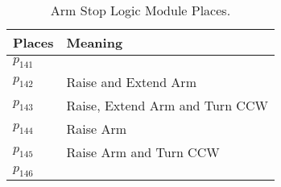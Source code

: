 \begin{table}[H]
\caption{Arm Stop Logic Module Places.}
\centering
\begin{tabular}{M{5cm}M{10cm}}
Places & Meaning\\
\hline
\hyperlink{partialNet:p141}{\hypertarget{partialTable:p141}{$p_{141}$}} & \\
\hyperlink{partialNet:p142}{\hypertarget{partialTable:p142}{$p_{142}$}} & Raise and Extend Arm\\
\hyperlink{partialNet:p143}{\hypertarget{partialTable:p143}{$p_{143}$}} & Raise, Extend Arm and Turn CCW\\
\hyperlink{partialNet:p144}{\hypertarget{partialTable:p144}{$p_{144}$}} & Raise Arm\\
\hyperlink{partialNet:p145}{\hypertarget{partialTable:p145}{$p_{145}$}} & Raise Arm and Turn CCW\\
\hyperlink{partialNet:p146}{\hypertarget{partialTable:p146}{$p_{146}$}} & \\
\end{tabular}
\end{table}
